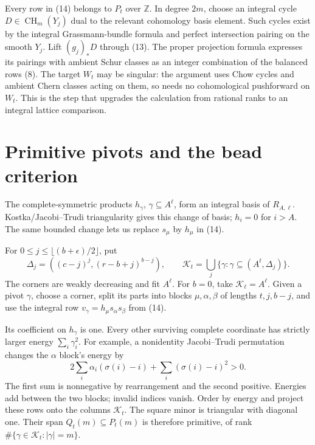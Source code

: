 \documentclass[11pt,letterpaper]{article}
\newcommand{\Z}{\mathbb Z}
\begin{document}
Every row in (14) belongs to \(P_t\) over \(\Z\).
In degree \(2m\), choose an integral cycle
\(D\in\operatorname{CH}_m(Y_j)\) dual to the relevant cohomology basis
element. Such cycles exist by the integral Grassmann-bundle formula
and perfect intersection pairing on the smooth \(Y_j\).
Lift \((g_j)_*D\) through (13). The proper projection formula expresses
its pairings with ambient Schur classes as an integer combination of
the balanced rows (8).
The target \(W_t\) may be singular: the argument uses Chow cycles and
ambient Chern classes acting on them, so needs no cohomological
pushforward on \(W_t\).
This is the step that upgrades the calculation from rational ranks to
an integral lattice comparison.

\newpage
\section{Primitive pivots and the bead criterion}
The complete-symmetric products \(h_\gamma\),
\(\gamma\subseteq A^\ell\), form an integral basis of \(R_{A,\ell}\).
Kostka/Jacobi--Trudi triangularity gives this change of basis;
\(h_i=0\) for \(i>A\).
The same bounded change lets us replace \(s_\mu\) by \(h_\mu\)
in (14).

For \(0\le j\le\lfloor(b+\epsilon)/2\rfloor\), put
\[
 \Delta_j=((c-j)^j,(r-b+j)^{b-j}),\qquad
 \mathcal K_t=\bigcup_j\{\gamma:\gamma\subseteq(A^t,\Delta_j)\}.
 \tag{15}
\]
The corners are weakly decreasing and fit \(A^\ell\).
For \(b=0\), take \(\mathcal K_\ell=A^\ell\).
Given a pivot \(\gamma\), choose a corner, split its parts into
blocks \(\mu,\alpha,\beta\) of lengths \(t,j,b-j\), and use the
integral row \(v_\gamma=h_\mu s_\alpha s_\beta\) from (14).

Its coefficient on \(h_\gamma\) is one.
Every other surviving complete coordinate has strictly larger energy
\(\sum_i\gamma_i^2\). For example, a nonidentity Jacobi--Trudi
permutation changes the \(\alpha\) block's energy by
\[
 2\sum_i\alpha_i(\sigma(i)-i)
       +\sum_i(\sigma(i)-i)^2>0.
 \tag{16}
\]
The first sum is nonnegative by rearrangement and the second positive.
Energies add between the two blocks; invalid indices vanish.
Order by energy and project these rows onto the columns \(\mathcal K_t\).
The square minor is triangular with diagonal one.
Their span \(Q_t(m)\subseteq P_t(m)\) is therefore primitive, of rank
\(\#\{\gamma\in\mathcal K_t:|\gamma|=m\}\).
\end{document}
